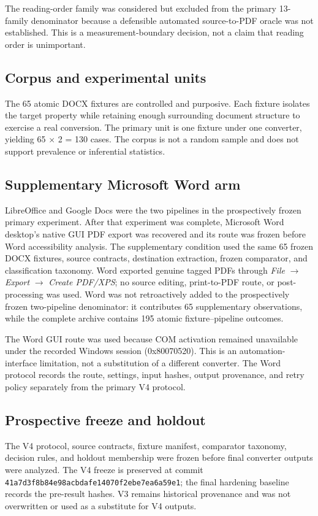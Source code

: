The reading-order family was considered but excluded from the primary 13-family denominator because a defensible automated source-to-PDF oracle was not established. This is a measurement-boundary decision, not a claim that reading order is unimportant.

\subsection{Corpus and experimental units}
The 65 atomic DOCX fixtures are controlled and purposive. Each fixture isolates the target property while retaining enough surrounding document structure to exercise a real conversion. The primary unit is one fixture under one converter, yielding 65 $\times$ 2 = 130 cases. The corpus is not a random sample and does not support prevalence or inferential statistics.

\subsection{Supplementary Microsoft Word arm}
LibreOffice and Google Docs were the two pipelines in the prospectively frozen primary experiment. After that experiment was complete, Microsoft Word desktop's native GUI PDF export was recovered and its route was frozen before Word accessibility analysis. The supplementary condition used the same 65 frozen DOCX fixtures, source contracts, destination extraction, frozen comparator, and classification taxonomy. Word exported genuine tagged PDFs through \textit{File} $\rightarrow$ \textit{Export} $\rightarrow$ \textit{Create PDF/XPS}; no source editing, print-to-PDF route, or post-processing was used. Word was not retroactively added to the prospectively frozen two-pipeline denominator: it contributes 65 supplementary observations, while the complete archive contains 195 atomic fixture--pipeline outcomes.

The Word GUI route was used because COM activation remained unavailable under the recorded Windows session (0x80070520). This is an automation-interface limitation, not a substitution of a different converter. The Word protocol records the route, settings, input hashes, output provenance, and retry policy separately from the primary V4 protocol.

\subsection{Prospective freeze and holdout}
The V4 protocol, source contracts, fixture manifest, comparator taxonomy, decision rules, and holdout membership were frozen before final converter outputs were analyzed. The V4 freeze is preserved at commit \texttt{41a7d3f8b84e98acbdafe14070f2ebe7ea6a59e1}; the final hardening baseline records the pre-result hashes. V3 remains historical provenance and was not overwritten or used as a substitute for V4 outputs.

